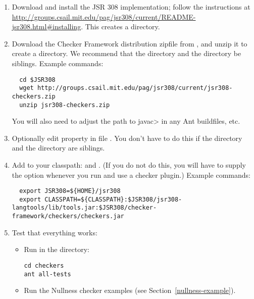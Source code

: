 \begin{enumerate}

\item Download and install the JSR 308 implementation; follow the instructions at
{\codesize\url{http://groups.csail.mit.edu/pag/jsr308/current/README-jsr308.html#installing}}.
This creates a  directory.

\item Download the Checker Framework distribution zipfile from
,
and unzip it to create a  directory.  We recommend that the
 directory and the  directory be siblings.
Example commands:

\begin{Verbatim}
  cd $JSR308
  wget http://groups.csail.mit.edu/pag/jsr308/current/jsr308-checkers.zip
  unzip jsr308-checkers.zip
\end{Verbatim}

You will also need to adjust the path to \<javac> in any Ant buildfiles,
etc.

\item Optionally edit property  in file
  .  You don't have to do this if the
   directory and the  directory are
  siblings.

\item Add to your classpath:
   and
  .
  (If you do not do this, you will have to supply the  option
  whenever you run  and use a checker plugin.)  Example
  commands:

\begin{smaller}
\begin{Verbatim}
  export JSR308=${HOME}/jsr308
  export CLASSPATH=${CLASSPATH}:$JSR308/jsr308-langtools/lib/tools.jar:$JSR308/checker-framework/checkers/checkers.jar
\end{Verbatim}
\end{smaller}

\item Test that everything works:

  \begin{itemize}

  \item Run  in the  directory:
\begin{Verbatim}
cd checkers
ant all-tests
\end{Verbatim}

  \item Run the Nullness checker examples (see
    Section~\ref{nullness-example}).

  \end{itemize}

\end{enumerate}

